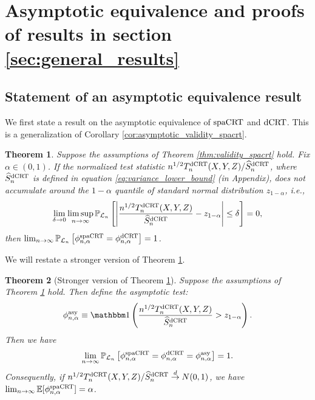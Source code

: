 \documentclass[12pt]{article}
\newtheorem{theorem}{Theorem}
\theoremstyle{definition}
\def\P{\mathbb{P}}
\def\P{\mathbb{P}}
\newcommand{\E}{\mathbb E}								%
\renewcommand{\P}{\mathbb{P}}							%
\newcommand{\indicator}{\mathbbm 1}						%
\newcommand{\convd}{\overset d \rightarrow}             %
\newcommand{\srx}{X}									%
\newcommand{\srz}{Z}									%
\newcommand{\sry}{Y}									%
\newcommand{\law}{\mathcal L}							%
\newcommand{\dCRT}{\textnormal{dCRT}} 					%
\newcommand{\spacrt}{\textnormal{spaCRT}}               %
\newcommand{\asy}{\textnormal{asy}}              %
\begin{document}
\section{Asymptotic equivalence and proofs of results in section \ref{sec:general_results}}\label{sec:proof_general_results}

\subsection{Statement of an asymptotic equivalence result}\label{sec:asymptotic_equivalence}

We first state a result on the asymptotic equivalence of $\spacrt$ and $\dCRT$. This is a generalization of Corollary \ref{cor:asymptotic_validity_spacrt}.
\begin{theorem}\label{thm:asymptotic_equivalence}
	Suppose the assumptions of Theorem \ref{thm:validity_spacrt} hold. Fix $\alpha\in (0,1)$. If the normalized test statistic $n^{1/2}T_n^{\dCRT}(\srx,\sry,\srz)/\widehat{S}_n^{\dCRT}$, where $\widehat{S}_n^{\dCRT}$ is defined in equation \eqref{eq:variance_lower_bound} (in Appendix), does not accumulate around the $1-\alpha$ quantile of standard normal distribution $z_{1-\alpha}$, i.e.,
  \begin{align}\label{eq:nonaccumulant_condition}
    \lim_{\delta\rightarrow0}\limsup_{n\rightarrow\infty}\P_{\law_n}\left[\left|\frac{n^{1/2}T_n^{\dCRT}(\srx,\sry,\srz)}{\widehat{S}_n^{\dCRT}}-z_{1-\alpha}\right|\leq \delta\right]=0,
  \end{align}
  then $\lim_{n\rightarrow\infty}\P_{\law_n}\left[\phi_{n,\alpha}^{\spacrt}=\phi_{n,\alpha}^{\dCRT}\right]=1$.
\end{theorem}
\noindent We will restate a stronger version of Theorem \ref{thm:asymptotic_equivalence}.
\begin{theorem}[Stronger version of Theorem \ref{thm:asymptotic_equivalence}]\label{thm:asymptotic_equivalence_stronger}
  Suppose the assumptions of Theorem \ref{thm:asymptotic_equivalence} hold. Then define the asymptotic test:
  \begin{align}\label{eq:asy_test}
    \phi_{n,\alpha}^{\asy}\equiv \indicator\left(\frac{n^{1/2}T_n^{\dCRT}(\srx,\sry,\srz)}{\widehat{S}_n^{\dCRT}}>z_{1-\alpha}\right).
  \end{align}
  Then we have
  \begin{align*}
    \lim_{n\rightarrow\infty}\P_{\law_n}\left[\phi_{n,\alpha}^{\spacrt}=\phi_{n,\alpha}^{\dCRT}=\phi_{n,\alpha}^{\asy}\right]=1.
  \end{align*}
  Consequently, if $n^{1/2}T_n^{\dCRT}(\srx,\sry,\srz)/\widehat{S}_n^{\dCRT}\convd N(0,1)$, we have $ \lim_{n\rightarrow\infty}\E[\phi_{n,\alpha}^{\spacrt}]=\alpha$.
\end{theorem}
\end{document}
